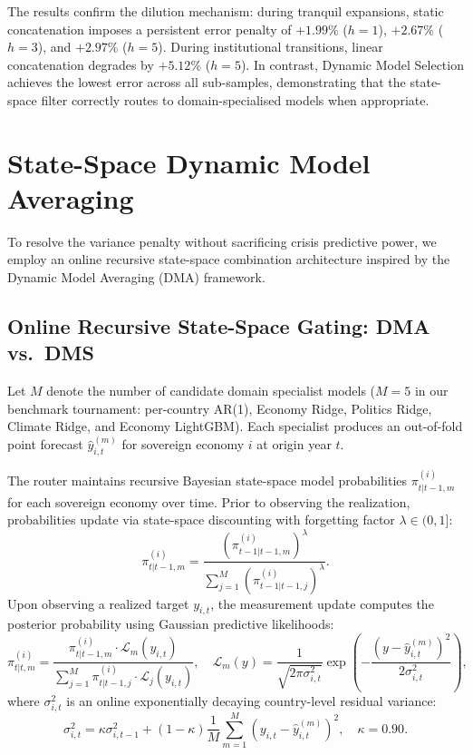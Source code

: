 \documentclass[11pt,a4paper]{article}
\begin{document}


The results confirm the dilution mechanism: during tranquil expansions, static concatenation imposes a persistent error penalty of $+1.99\%$ ($h{=}1$), $+2.67\%$ ($h{=}3$), and $+2.97\%$ ($h{=}5$). During institutional transitions, linear concatenation degrades by $+5.12\%$ ($h{=}5$). In contrast, Dynamic Model Selection achieves the lowest error across all sub-samples, demonstrating that the state-space filter correctly routes to domain-specialised models when appropriate.


\section{State-Space Dynamic Model Averaging}
\label{sec:dms}

To resolve the variance penalty without sacrificing crisis predictive power, we employ an online recursive state-space combination architecture inspired by the \citet{koop2012} Dynamic Model Averaging (DMA) framework.

\subsection{Online Recursive State-Space Gating: DMA vs.\ DMS}

Let $M$ denote the number of candidate domain specialist models ($M=5$ in our benchmark tournament: per-country AR(1), Economy Ridge, Politics Ridge, Climate Ridge, and Economy LightGBM). Each specialist produces an out-of-fold point forecast $\hat{y}_{i,t}^{(m)}$ for sovereign economy $i$ at origin year $t$.

The router maintains recursive Bayesian state-space model probabilities $\pi_{t|t-1, m}^{(i)}$ for each sovereign economy over time. Prior to observing the realization, probabilities update via state-space discounting with forgetting factor $\lambda \in (0, 1]$:
\begin{equation}
\pi_{t|t-1, m}^{(i)} = \frac{(\pi_{t-1|t-1, m}^{(i)})^\lambda}{\sum_{j=1}^M (\pi_{t-1|t-1, j}^{(i)})^\lambda}.
\end{equation}
Upon observing a realized target $y_{i,t}$, the measurement update computes the posterior probability using Gaussian predictive likelihoods:
\begin{equation}
\pi_{t|t, m}^{(i)} = \frac{\pi_{t|t-1, m}^{(i)} \cdot \mathcal{L}_m(y_{i,t})}{\sum_{j=1}^M \pi_{t|t-1, j}^{(i)} \cdot \mathcal{L}_j(y_{i,t})}, \quad \mathcal{L}_m(y) = \frac{1}{\sqrt{2\pi \sigma_{i,t}^2}} \exp\left(-\frac{(y - \hat{y}_{i,t}^{(m)})^2}{2\sigma_{i,t}^2}\right),
\end{equation}
where $\sigma_{i,t}^2$ is an online exponentially decaying country-level residual variance:
\begin{equation}
\sigma_{i,t}^2 = \kappa \sigma_{i,t-1}^2 + (1-\kappa) \frac{1}{M} \sum_{m=1}^M (y_{i,t} - \hat{y}_{i,t}^{(m)})^2, \quad \kappa = 0.90.
\end{equation}
\end{document}
